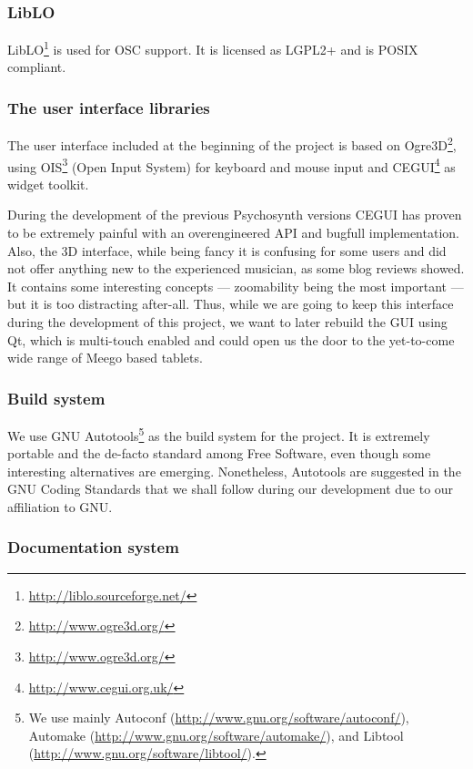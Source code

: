 \subsubsection{LibLO}

LibLO\footnote{\url{http://liblo.sourceforge.net/}} is used for OSC
support. It is licensed as LGPL2+ and is POSIX compliant.

\subsubsection{The user interface libraries}

The user interface included at the beginning of the project is based
on Ogre3D\footnote{\url{http://www.ogre3d.org/}}, using
OIS\footnote{\url{http://www.ogre3d.org/}} (Open Input System) for
keyboard and mouse input and
CEGUI\footnote{\url{http://www.cegui.org.uk/}} as widget toolkit.

During the development of the previous Psychosynth versions CEGUI has
proven to be extremely painful with an overengineered API and bugfull
implementation. Also, the 3D interface, while being fancy it is
confusing for some users and did not offer anything new to the
experienced musician, as some blog reviews showed. It contains some
interesting concepts --- zoomability being the most important --- but
it is too distracting after-all. Thus, while we are going to keep this
interface during the development of this project, we want to later
rebuild the GUI using Qt, which is multi-touch enabled and could open
us the door to the yet-to-come wide range of Meego based tablets.

\subsubsection{Build system}

We use GNU Autotools\footnote{We use mainly Autoconf
  (\url{http://www.gnu.org/software/autoconf/}), Automake
  (\url{http://www.gnu.org/software/automake/}), and Libtool
  (\url{http://www.gnu.org/software/libtool/}).} as the build system
for the project. It is extremely portable and the de-facto standard
among Free Software, even though some interesting alternatives are
emerging. Nonetheless, Autotools are suggested in the GNU Coding
Standards\cite{stallman10coding} that we shall follow during our
development due to our affiliation to GNU.

\subsubsection{Documentation system}

